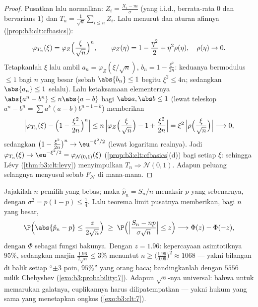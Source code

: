 \begin{proof}
Pusatkan lalu normalkan: $Z_i = \frac{X_i - m}{\sigma}$
(yang i.i.d., berrata-rata $0$ dan bervarians $1$) dan $T_n =
\frac1{\sqrt n}\sum_{i\leq n}Z_i$. Lalu menurut  dan
aturan afinnya (\cref{prop:b3:clt:cfbasics}):
\[
\varphi_{T_n}(\xi) =
\varphi_{Z}\Bigl(\frac{\xi}{\sqrt n}\Bigr)^{n},
\qquad
\varphi_Z(\eta) = 1 - \frac{\eta^2}2 + \eta^2\rho(\eta),\quad
\rho(\eta)\to0 .
\]
Tetapkanlah $\xi$ lalu ambil $a_n = \varphi_Z(\xi/\sqrt n)$, $b_n = 1 -
\frac{\xi^2}{2n}$: keduanya bermodulus $\leq 1$ bagi $n$ yang besar
(sebab $\abs{b_n} \leq 1$ begitu $\xi^2 \leq 4n$; sedangkan $\abs{a_n} \leq 1$
selalu). Lalu ketaksamaan elementernya $\abs{a^n - b^n} \leq
n\abs{a - b}$ bagi $\abs a, \abs b \leq 1$ (lewat teleskop
$a^n - b^n = \sum a^k(a - b)b^{n-1-k}$) memberikan
\[
\Bigl|\varphi_{T_n}(\xi) - \Bigl(1 -
\frac{\xi^2}{2n}\Bigr)^{n}\Bigr|
\leq n\,\Bigl|\varphi_Z\Bigl(\frac\xi{\sqrt n}\Bigr) - 1 +
\frac{\xi^2}{2n}\Bigr|
= \xi^2\,\Bigl|\rho\Bigl(\frac{\xi}{\sqrt n}\Bigr)\Bigr|
\longrightarrow 0,
\]
sedangkan $\bigl(1 - \frac{\xi^2}{2n}\bigr)^n \to
\eu^{-\xi^2/2}$ (lewat logaritma realnya). Jadi $\varphi_{T_n}(\xi) \to
\eu^{-\xi^2/2} = \varphi_{\mathcal N(0,1)}(\xi)$
(\cref{prop:b3:clt:cfbasics}(d)) bagi setiap $\xi$: sehingga Lévy
(\cref{thm:b3:clt:levy}) menyimpulkan $T_n \Rightarrow \mathcal
N(0,1)$. Adapun peluang selangnya menyusul sebab $F_{\mathcal
N}$  di mana-mana.
\end{proof}

\begin{example}
\label{ex:b3:clt:confidence}
Jajakilah $n$ pemilih yang bebas; maka $\hat p_n = S_n/n$ menaksir
$p$ yang sebenarnya, dengan $\sigma^2 = p(1-p) \leq \frac14$. Lalu teorema limit
pusatnya memberikan, bagi $n$ yang besar,
\[
\P\Bigl(\abs{\hat p_n - p} \leq
\frac{z}{2\sqrt n}\Bigr)
\;\geq\; \P\Bigl(\Bigl|\frac{S_n - np}{\sigma\sqrt n}\Bigr|
\leq z\Bigr)
\longrightarrow \Phi(z) - \Phi(-z),
\]
dengan $\Phi$ sebagai fungsi  bakunya.
Dengan $z = 1.96$: kepercayaan asimtotiknya $95\%$, sedangkan marjin
$\frac{1.96}{2\sqrt n} \leq 3\%$ menuntut $n \geq
\bigl(\frac{1.96}{0.06}\bigr)^2 \approx 1068$ --- yakni bilangan
di balik setiap ``$\pm3$ poin, $95\%$'' yang orang baca; bandingkanlah
dengan $5556$ milik Chebyshev (\cref{exo:b3:probability:7}). Adapun
$\sqrt n$-nya universal: bahwa untuk memarukan galatnya, cuplikannya harus
dilipatempatkan --- yakni hukum yang sama yang menetapkan ongkos 
(\cref{exo:b3:clt:7}).
\end{example}

